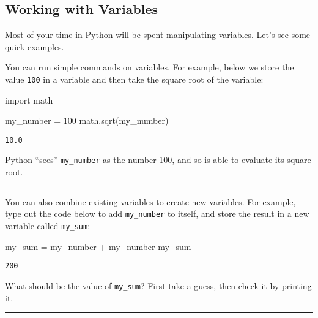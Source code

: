 \documentclass[
  letterpaper,
  DIV=11,
  numbers=noendperiod]{scrreprt}
\newenvironment{Shaded}{\begin{snugshade}}{\end{snugshade}}
\newcommand{\DecValTok}[1]{\textcolor[rgb]{0.68,0.00,0.00}{#1}}
\newcommand{\ImportTok}[1]{\textcolor[rgb]{0.00,0.46,0.62}{#1}}
\newcommand{\NormalTok}[1]{\textcolor[rgb]{0.00,0.23,0.31}{#1}}
\newcommand{\OperatorTok}[1]{\textcolor[rgb]{0.37,0.37,0.37}{#1}}
\begin{document}
\subsection{Working with Variables}\label{working-with-variables}

Most of your time in Python will be spent manipulating variables. Let's
see some quick examples.

You can run simple commands on variables. For example, below we store
the value \texttt{100} in a variable and then take the square root of
the variable:

\begin{Shaded}
\begin{Highlighting}[]
\ImportTok{import}\NormalTok{ math}

\NormalTok{my\_number }\OperatorTok{=} \DecValTok{100}
\NormalTok{math.sqrt(my\_number)}
\end{Highlighting}
\end{Shaded}

\begin{verbatim}
10.0
\end{verbatim}

Python ``sees'' \texttt{my\_number} as the number 100, and so is able to
evaluate its square root.

\begin{center}\rule{0.5\linewidth}{0.5pt}\end{center}

You can also combine existing variables to create new variables. For
example, type out the code below to add \texttt{my\_number} to itself,
and store the result in a new variable called \texttt{my\_sum}:

\begin{Shaded}
\begin{Highlighting}[]
\NormalTok{my\_sum }\OperatorTok{=}\NormalTok{ my\_number }\OperatorTok{+}\NormalTok{ my\_number}
\NormalTok{my\_sum}
\end{Highlighting}
\end{Shaded}

\begin{verbatim}
200
\end{verbatim}

What should be the value of \texttt{my\_sum}? First take a guess, then
check it by printing it.

\begin{center}\rule{0.5\linewidth}{0.5pt}\end{center}
\end{document}
